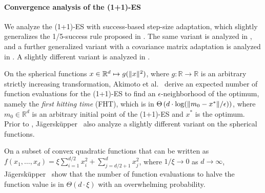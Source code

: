 \documentclass[journal]{IEEEtran}
\providecommand{\R}{\mathbb{R}} %
\DeclarePairedDelimiter{\norm}{\lVert}{\rVert}
\theoremstyle{definition}
\begin{document}
\paragraph{Convergence analysis of the (1+1)-ES}

We analyze the (1+1)-ES with success-based step-size adaptation, which slightly generalizes the 1/5-success rule proposed in \cite{kern2004learning}. The same variant is analyzed in  \cite{akimoto2018drift,auger2013linear,morinaga2019generalized,glasmachers2020global}, and a further generalized variant with a covariance matrix adaptation is analyzed in \cite{morinaga2021convergence}. 
A slightly different variant is analyzed in \cite{jagerskupper2003analysis, jagerskupper20061+, jagerskupper2007algorithmic}.

On the spherical functions $x\in\R^d\mapsto g(\norm{x}^2)$, where $g:\R\to\R$ is an arbitrary strictly increasing transformation, Akimoto et al.~\cite{akimoto2018drift} derive an expected number of function evaluations for the (1+1)-ES to find an $\epsilon$-neighborhood of the optimum, namely the \emph{first hitting time} (FHT), which is in $\Theta\left(d\cdot\log(\norm{m_0 - x^*}/\epsilon)\right)$, where $m_0\in\R^d$ is an arbitrary initial point of the (1+1)-ES and $x^*$ is the optimum. Prior to \cite{akimoto2018drift}, J\"{a}gersk\"{u}pper~\cite{jagerskupper2003analysis,jagerskupper2007algorithmic} also analyze a slightly different variant on the spherical functions.

On a subset of convex quadratic functions that can be written as
$f(x_1,\ldots,x_d) = \xi\sum_{i=1}^{d/2} x_i^2 + \sum_{j=d/2+1}^d x_j^2$, where $1/\xi\to 0$ as $d\to\infty$,
J\"{a}gersk\"{u}pper~\cite{jagerskupper20061+} show that the number of function evaluations to halve the function value is in $\Theta(d \cdot \xi)$ with an overwhelming probability.
\end{document}
